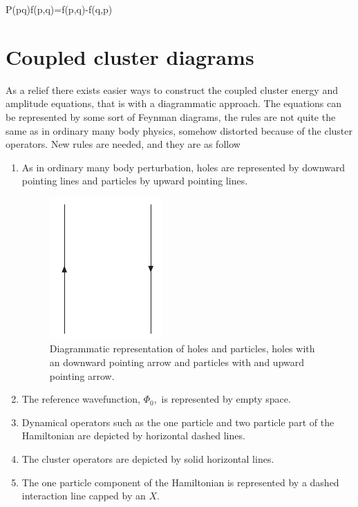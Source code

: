 \be
P(pq)f(p,q)=f(p,q)-f(q,p)
\ee


\section{Coupled cluster diagrams}

As a relief there exists easier ways to construct the coupled 
cluster energy and amplitude equations, that is with a diagrammatic
approach. The equations can be represented by some sort of Feynman
diagrams, the rules are not quite the same as in ordinary many body
physics, somehow distorted because of the cluster operators. 
New rules are needed, and they are as follow

\begin{enumerate}
\item As in ordinary many body perturbation, holes are represented 
by downward pointing lines and particles by upward pointing lines.

\begin{figure}[htp]
\centering
\includegraphics[scale=0.75]{holepart}
\caption{Diagrammatic representation of holes and particles, holes 
with an downward pointing arrow and particles with and upward pointing arrow.}
\label{holepart}
\end{figure}

\item The reference wavefunction, $\Phi_0,$ is represented by empty
 space.

\item Dynamical operators such as the one particle and two particle
part of the Hamiltonian are depicted by horizontal dashed lines.

\item The cluster operators are depicted by solid horizontal lines.

\item The one particle component of the Hamiltonian is represented
by a dashed interaction line capped by an $X.$



\end{enumerate}
